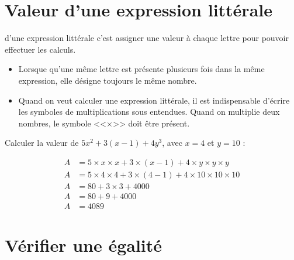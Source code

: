 \documentclass[12pt,a4paper]{article}
\begin{document}
\newpage

\section{Valeur d'une expression littérale}

	\begin{mydef}
		 d'une expression littérale c'est assigner une valeur à chaque lettre pour pouvoir effectuer les calculs.
	\end{mydef}

	\begin{myrems}
		\begin{itemize}
			\item Lorsque qu'une même lettre est présente plusieurs fois dans la même expression, elle désigne toujours le même nombre.
			\item Quand on veut calculer une expression littérale, il est indispensable d'écrire les symboles de multiplications sous entendues. Quand on multiplie deux nombres, le symbole <<$\times$>> doit être présent.
		\end{itemize}
	\end{myrems}


	\begin{myex}
		Calculer la valeur de $5x^2 + 3(x-1)+4y^3 $, avec $x=4$ et $y=10$ :
		
		\begin{align*}
			A &= 5 \times x \times x + 3 \times (x - 1) + 4 \times y \times y \times y \\ %
			A &= 5 \times 4 \times 4 + 3 \times (4 - 1) + 4 \times 10 \times 10 \times 10 \\%
			A &= 80 + 3 \times 3 + \num{4000} \\ %
			A &= 80 + 9 + \num{4000} \\
			A &= \num{4089}
		\end{align*}
	\end{myex}

\newpage

\section{Vérifier une égalité}
\end{document}
